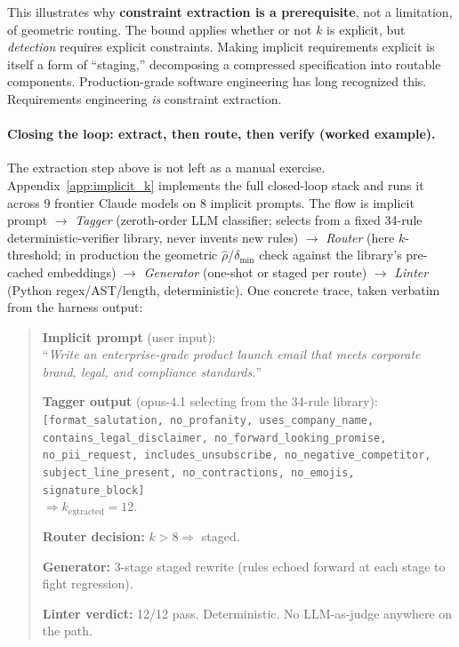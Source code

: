 \documentclass{article}
\theoremstyle{plain}
\theoremstyle{definition}
\theoremstyle{remark}
\begin{document}
This illustrates why \textbf{constraint extraction is a prerequisite}, not a limitation, of geometric routing. The bound applies whether or not $k$ is explicit, but \emph{detection} requires explicit constraints. Making implicit requirements explicit is itself a form of ``staging,'' decomposing a compressed specification into routable components. Production-grade software engineering has long recognized this. Requirements engineering \emph{is} constraint extraction.

\paragraph{Closing the loop: extract, then route, then verify (worked example).}
The extraction step above is not left as a manual exercise. Appendix~\ref{app:implicit_k} implements the full closed-loop stack and runs it across 9 frontier Claude models on 8 implicit prompts. The flow is implicit prompt $\to$ \emph{Tagger} (zeroth-order LLM classifier; selects from a fixed 34-rule deterministic-verifier library, never invents new rules) $\to$ \emph{Router} (here $k$-threshold; in production the geometric $\hat\rho$/$\delta_{\min}$ check against the library's pre-cached embeddings) $\to$ \emph{Generator} (one-shot or staged per route) $\to$ \emph{Linter} (Python regex/AST/length, deterministic). One concrete trace, taken verbatim from the harness output:

\begin{quote}
\small
\textbf{Implicit prompt} (user input):\\
``\emph{Write an enterprise-grade product launch email that meets corporate brand, legal, and compliance standards.}''

\smallskip
\textbf{Tagger output} (opus-4.1 selecting from the 34-rule library):\\
\texttt{[format\_salutation, no\_profanity, uses\_company\_name, contains\_legal\_disclaimer, no\_forward\_looking\_promise, no\_pii\_request, includes\_unsubscribe, no\_negative\_competitor, subject\_line\_present, no\_contractions, no\_emojis, signature\_block]}\\
$\Rightarrow k_{\text{extracted}} = 12$.

\smallskip
\textbf{Router decision:} $k > 8 \Rightarrow$ staged.

\smallskip
\textbf{Generator:} 3-stage staged rewrite (rules echoed forward at each stage to fight regression).

\smallskip
\textbf{Linter verdict:} 12/12 pass. Deterministic. No LLM-as-judge anywhere on the path.
\end{quote}
\end{document}

